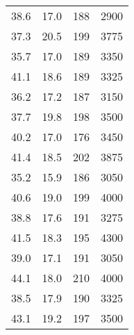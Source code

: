 \documentclass[
]{article}
\begin{document}
\begin{longtable}[]{@{}rrrr@{}}
38.6 & 17.0 & 188 & 2900 \\
37.3 & 20.5 & 199 & 3775 \\
35.7 & 17.0 & 189 & 3350 \\
41.1 & 18.6 & 189 & 3325 \\
36.2 & 17.2 & 187 & 3150 \\
37.7 & 19.8 & 198 & 3500 \\
40.2 & 17.0 & 176 & 3450 \\
41.4 & 18.5 & 202 & 3875 \\
35.2 & 15.9 & 186 & 3050 \\
40.6 & 19.0 & 199 & 4000 \\
38.8 & 17.6 & 191 & 3275 \\
41.5 & 18.3 & 195 & 4300 \\
39.0 & 17.1 & 191 & 3050 \\
44.1 & 18.0 & 210 & 4000 \\
38.5 & 17.9 & 190 & 3325 \\
43.1 & 19.2 & 197 & 3500 \\
\bottomrule
\end{longtable}
\end{document}
